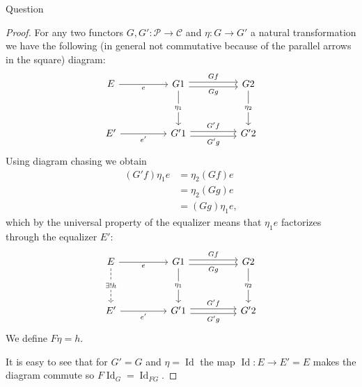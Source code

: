 \documentclass{article}
\DeclareMathOperator{\Id}{Id}
\newcommand{\cat}{\mathcal{C}}
\newcommand{\pcat}{\mathcal{P}}
\newenvironment{question}[1][]{\begin{paragraph}{Question #1}}{\end{paragraph}}
\theoremstyle{definition}
\begin{document}
\begin{question}
\begin{proof}
        For any two functors \(G,G':\pcat\to\cat\) and \(\eta:G\to G'\) a
        natural transformation we have the following (in general not
        commutative because of the parallel arrows in the square) diagram:
        \[
            \begin{tikzcd}[ampersand replacement=\&]
                E \&\& G1 \&\& G2 \\
                \\
                {E'} \&\& {G'1} \&\& {G'2}
                \arrow["Gg"', shift right=1, from=1-3, to=1-5]
                \arrow["Gf", shift left=1, from=1-3, to=1-5]
                \arrow["{G'f}", shift left=1, from=3-3, to=3-5]
                \arrow["{G'g}"', shift right=1, from=3-3, to=3-5]
                \arrow["{\eta_{1}}"{description}, from=1-3, to=3-3]
                \arrow["{\eta_{2}}"{description}, from=1-5, to=3-5]
                \arrow["e"', from=1-1, to=1-3]
                \arrow["{e'}"', from=3-1, to=3-3]
            \end{tikzcd}
        \]
        Using diagram chasing we obtain
        \begin{align*}
            (G'f)\eta_{1}e & =\eta_{2}(Gf)e  \\
                           & =\eta_{2}(Gg)e  \\
                           & =(Gg)\eta_{1}e,
        \end{align*}
        which by the universal property of the equalizer means that
        \(\eta_{1}e\) factorizes through the equalizer \(E'\):
        \[
            \begin{tikzcd}[ampersand replacement=\&]
                E \&\& G1 \&\& G2 \\
                \\
                {E'} \&\& {G'1} \&\& {G'2}
                \arrow["Gg"', shift right=1, from=1-3, to=1-5]
                \arrow["Gf", shift left=1, from=1-3, to=1-5]
                \arrow["{G'f}", shift left=1, from=3-3, to=3-5]
                \arrow["{G'g}"', shift right=1, from=3-3, to=3-5]
                \arrow["{\eta_{1}}"{description}, from=1-3, to=3-3]
                \arrow["{\eta_{2}}"{description}, from=1-5, to=3-5]
                \arrow["e"', from=1-1, to=1-3]
                \arrow["{e'}"', from=3-1, to=3-3]
                \arrow["{\exists!h}"{description}, dashed, from=1-1, to=3-1]
            \end{tikzcd}
        \]
        We define \(F\eta=h\).

        It is easy to see that for \(G'=G\) and \(\eta=\Id\) the map \(\Id:E\to
        E'=E\) makes the diagram commute so \(F\Id_{G}=\Id_{FG}\).


\end{proof}
\end{question}
\end{document}
